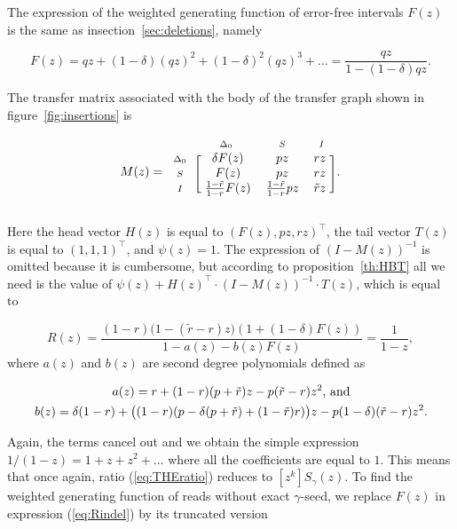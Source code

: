 \documentclass{article}
\newcommand{\smI}{\scriptstyle{I}}
\newcommand{\smS}{\scriptstyle{S}}
\newcommand{\smDELz}{\scriptstyle{\Delta_0}}
\begin{document}
The expression of the weighted generating function of error-free intervals
$F(z)$ is the same as insection~\ref{sec:deletions}, namely

\begin{equation*}
F(z) = qz + (1-\delta)(qz)^2 + (1-\delta)^2(qz)^3 + \ldots =
\frac{qz}{1-(1-\delta)qz}.
\end{equation*}

The transfer matrix associated with the body of the transfer graph shown
in figure~\ref{fig:insertions} is

\begin{equation*}
M(z) = 
\begin{blockarray}{cccc}
       & \smDELz & \smS & \smI \\
\begin{block}{c[ccc]}
\smDELz & \; \delta F(z) & pz & rz \; \\
\smS    & \;        F(z) & pz & rz \; \\
\smI    & \; \frac{1-\tilde{r}}{1-r}F(z)
           & \frac{1-\tilde{r}}{1-r}pz & \tilde{r}z \; \\
\end{block}
\end{blockarray}.
\end{equation*}

Here the head vector $H(z)$ is equal to $(F(z), pz, rz)^\top$, the tail
vector $T(z)$ is equal to $(1,1,1)^\top$, and $\psi(z) = 1$. The
expression of $(I-M(z))^{-1}$ is omitted because it is cumbersome, but
according to proposition~\ref{th:HBT} all we need is the value of
$\psi(z)+H(z)^\top \cdot (I-M(z))^{-1} \cdot T(z)$, which is equal to

\begin{equation}
\label{eq:Rindel}
R(z) = \frac{(1-r)\big( 1-(\tilde{r}-r)z \big)
\left(1+(1-\delta)F(z) \right)}{1-a(z)-b(z)F(z)}
= \frac{1}{1-z},
\end{equation}
where $a(z)$ and $b(z)$ are second degree polynomials defined as

\begin{gather}
\label{eq:a+b}
a(z) = r+(1-r)(p+\tilde{r})z
- p(\tilde{r}-r)z^2\text{, and} \\
b(z) = \delta(1-r) +
\big((1-r)(p-\delta(p+\tilde{r})+(1-\tilde{r})r)\big)z
-p(1-\delta)(\tilde{r}-r)z^2.
\notag
\end{gather}


Again, the terms cancel out and we obtain the simple expression $1/(1-z) =
1+z+z^2 + \ldots$ where all the coefficients are equal to $1$. This means
that once again, ratio (\ref{eq:THEratio}) reduces to $[z^k]S_\gamma(z)$.
To find the weighted generating function of reads without exact
$\gamma$-seed, we replace $F(z)$ in expression (\ref{eq:Rindel}) by its
truncated version
\end{document}
